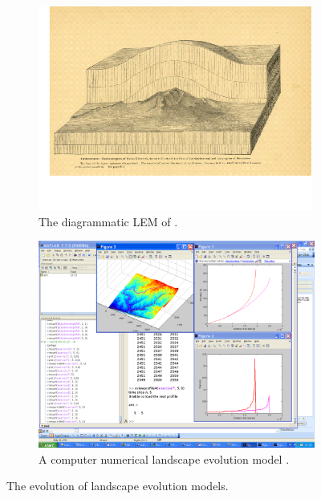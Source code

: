 \begin{figure}
\begin{subfigure}[b]{0.7\textwidth}
\includegraphics[width=\textwidth]{LEMFinalRevisedmanuscriptDAVFinalrevisions-img/LEMFinalRevisedmanuscriptDAVFinalrevisions-img001.png} 
\caption{The diagrammatic LEM of \citet{Gilbert1877}.}
\label{gilbert_fig}
\end{subfigure}%

\vspace{4em}
\begin{subfigure}[b]{0.7\textwidth}
\includegraphics[width=\textwidth]{LEMFinalRevisedmanuscriptDAVFinalrevisions-img/LEMFinalRevisedmanuscriptDAVFinalrevisions-img002.png} 
\caption{A computer numerical landscape evolution model \citep[CHILD,][]{Tucker2001}.}
\label{child_fig}
\end{subfigure}

\caption{The evolution of landscape evolution models.} 
\label{fig_gilbert_child}
\end{figure}



